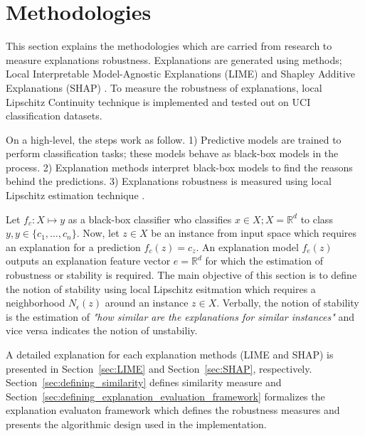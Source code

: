 \documentclass[english]{tktltiki2}
\theoremstyle{definition}
\theoremstyle{remark}
\begin{document}
\section{Methodologies}\label{sec:methodologies} %
This section explains the methodologies which are carried from research to measure explanations robustness. Explanations are generated using methods; Local Interpretable Model-Agnostic Explanations (LIME) and Shapley Additive Explanations (SHAP) \citep{ribeiro2016should,lundberg2017unified}. To measure the robustness of explanations, local Lipschitz Continuity technique \citep{alvarez2018robustness} is implemented and tested out on UCI classification datasets.

On a high-level, the steps work as follow. 1) Predictive models are trained to perform classification tasks; these models behave as black-box models in the process. 2) Explanation methods interpret black-box models to find the reasons behind the predictions. 3) Explanations robustness is measured using local Lipschitz estimation technique \citep{alvarez2018robustness}.

Let $f_c: X \mapsto y$ as a black-box classifier who classifies $x \in X; X = {\mathbb{R}}^d$ to class $y, y \in \{c_1, \dots, c_n\}$. Now, let $z \in X$ be an instance from input space which requires an explanation for a prediction $f_c(z) = c_z$. An explanation model $f_e(z)$ outputs an explanation feature vector $ e = {\mathbb{R}}^d$ for which the estimation of robustness or stability is required. The main objective of this section is to define the notion of stability using local Lipschitz esitmation which requires a neighborhood $N_{\epsilon}(z)$ around an instance $z \in X$. Verbally, the notion of stability is the estimation of \textit{"how similar are the explanations for similar instances"} and vice versa indicates the notion of unstabiliy.

A detailed explanation for each explanation methods (LIME and SHAP) is presented in Section~\ref{sec:LIME} and Section~\ref{sec:SHAP}, respectively. Section~\ref{sec:defining_similarity} defines similarity measure and Section~\ref{sec:defining_explanation_evaluation_framework} formalizes the explanation evaluaton framework which defines the robustness measures and presents the algorithmic design used in the implementation.
\end{document}
